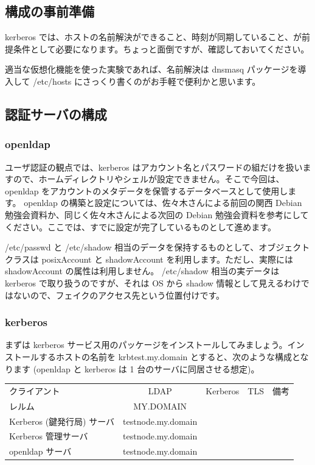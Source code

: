 \documentclass[mingoth,a4paper]{jsarticle}
\begin{document}
\subsection{構成の事前準備}
kerberos では、ホストの名前解決ができること、時刻が同期していること、が前提条件として必要になります。ちょっと面倒ですが、確認しておいてください。

適当な仮想化機能を使った実験であれば、名前解決は dnsmasq パッケージを導入して /etc/hosts にさっくり書くのがお手軽で便利かと思います。

\subsection{認証サーバの構成}

\subsubsection{openldap}
ユーザ認証の観点では、kerberos はアカウント名とパスワードの組だけを扱いますので、ホームディレクトリやシェルが設定できません。そこで今回は、openldap をアカウントのメタデータを保管するデータベースとして使用します。
openldap の構築と設定については、佐々木さんによる前回の関西 Debian 勉強会資料か、同じく佐々木さんによる次回の Debian 勉強会資料を参考にしてください。ここでは、すでに設定が完了しているものとして進めます。

/etc/passwd と /etc/shadow 相当のデータを保持するものとして、オブジェクトクラスは posixAccount と shadowAccount を利用します。ただし、実際には shadowAccount の属性は利用しません。
/etc/shadow 相当の実データは kerberos で取り扱うのですが、それは OS から shadow 情報として見えるわけではないので、フェイクのアクセス先という位置付けです。

\subsubsection{kerberos}

まずは kerberos サービス用のパッケージをインストールしてみましょう。インストールするホストの名前を krbtest.my.domain とすると、次のような構成となります (openldap と kerberos は 1 台のサーバに同居させる想定)。

\begin{table}[htb]
  \begin{tabular}{lcccr}
    クライアント & LDAP & Kerberos & TLS & 備考 \\

    レルム & MY.DOMAIN \\
    Kerberos (鍵発行局) サーバ & testnode.my.domain \\
    Kerberos 管理サーバ & testnode.my.domain \\
    openldap サーバ & testnode.my.domain \\
  \end{tabular}
\end{table}
\end{document}
